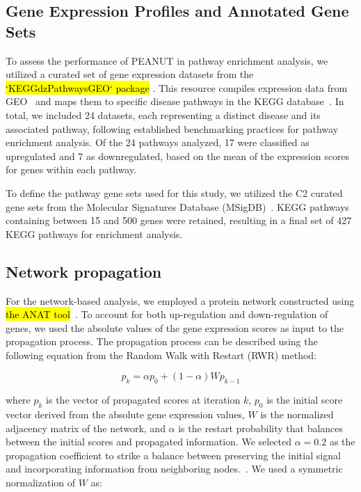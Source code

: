 \documentclass{article}
\begin{document}
\subsection{Gene Expression Profiles and Annotated Gene Sets}
To assess the performance of PEANUT in pathway enrichment analysis, we utilized a curated set of gene expression datasets from the \hl{`KEGGdzPathwaysGEO` package} \cite{Tarca2013}. This resource compiles expression data from GEO~\cite{Barrett2013} and maps them to specific disease pathways in the 
KEGG database~\cite{Kanehisa2017}. 
 In total, we included 24 datasets, each representing a distinct disease and its associated pathway, following established benchmarking practices for pathway enrichment analysis. 
Of the 24 pathways analyzed, 17 were classified as upregulated and 7 as downregulated, based on the mean of the expression scores for genes within each pathway. 

To define the pathway gene sets used for this study, we utilized the C2 curated gene sets from the Molecular Signatures Database (MSigDB)~\cite{Subramanian2005,Liberzon2011,Liberzon2015}. KEGG pathways containing between 15 and 500 genes were retained, resulting in a final set of 427 KEGG pathways for enrichment analysis.

\subsection{Network propagation}

For the network-based analysis, we employed a protein network constructed using \hl{the ANAT tool}~\cite{Signorini2021, Yosef2011}. To account for both up-regulation and down-regulation of genes, we used the absolute values of the gene expression scores as input to the propagation process. The propagation process can be described using the following equation from the Random Walk with Restart (RWR) method:

\[
p_k = \alpha p_0 + (1-\alpha) W p_{k-1}
\]

where \(p_k\) is the vector of propagated scores at iteration \(k\), \(p_0\) is the initial score vector derived from the absolute gene expression values, \(W\) is the normalized adjacency matrix of the network, and \(\alpha\) is the restart probability that balances between the initial scores and propagated information.
We selected \(\alpha = 0.2\) as the propagation coefficient to strike a balance between preserving the initial signal and incorporating information from neighboring nodes.~\cite{Charmpi2021,Vanunu2010}. We used a symmetric normalization of \(W\) as:
\end{document}
